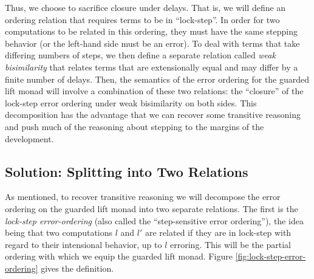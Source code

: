 Thus, we choose to sacrifice closure under delays. That is, we will define an
ordering relation that requires terms to be in ``lock-step''. In order for two
computations to be related in this ordering, they must have the same stepping
behavior (or the left-hand side must be an error). To deal with terms that take
differing numbers of steps, we then define a separate relation called \emph{weak
bisimilarity} that relates terms that are extensionally equal and may differ by
a finite number of delays. Then, the semantics of the error ordering for the
guarded lift monad will involve a combination of these two relations: the
``closure'' of the lock-step error ordering under weak bisimilarity on both
sides.
This decomposition has the advantage that we can recover some transitive
reasoning and push much of the reasoning about stepping to the margins of the
development.


\subsection{Solution: Splitting into Two Relations}\label{sec:lock-step-and-weak-bisim}

As mentioned, to recover transitive reasoning we will decompose the error
ordering on the guarded lift monad into two separate relations. The first is the
\emph{lock-step error-ordering} (also called the ``step-sensitive error
ordering''), the idea being that two computations $l$ and $l'$ are related if
they are in lock-step with regard to their intensional behavior, up to $l$
erroring. This will be the partial ordering with which we equip the guarded lift monad.
Figure \ref{fig:lock-step-error-ordering} gives the definition.

